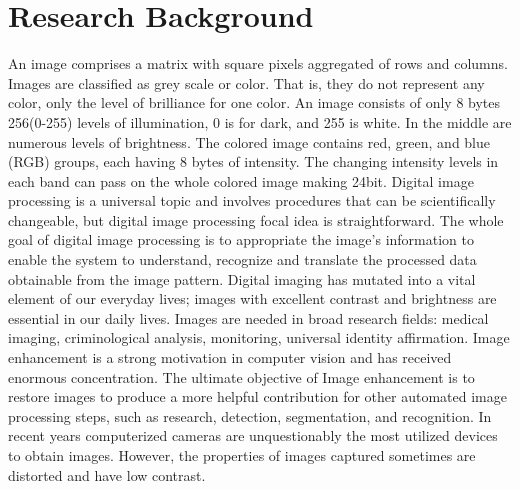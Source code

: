 \documentclass[doctor,english,listoffigures,listoftables]{thesis-uestc}
\begin{document}
\section{Research Background}
An image comprises a matrix with square pixels aggregated of rows and columns. Images are classified as grey scale or color. That is, they do not represent any color, only the level of brilliance for one color. An image consists of only 8 bytes 256(0-255) levels of illumination, 0 is for dark, and 255 is white. In the middle are numerous levels of brightness. The colored image contains red, green, and blue (RGB) groups, each having 8 bytes of intensity. The changing intensity levels in each band can pass on the whole colored image making 24bit. Digital image processing is a universal topic and involves procedures that can be scientifically changeable, but digital image processing focal idea is straightforward. The whole goal of digital image processing is to appropriate the image’s information to enable the system to understand, recognize and translate the processed data obtainable from the image pattern. Digital imaging has mutated into a vital element of our everyday lives; images with excellent contrast and brightness are essential in our daily lives. Images are needed in broad research fields: medical imaging, criminological analysis, monitoring, universal identity affirmation. Image enhancement is a strong motivation in computer vision and has received enormous concentration. The ultimate objective of Image enhancement is to restore images to produce a more helpful contribution for other automated image processing steps, such as research, detection, segmentation, and recognition. In recent years computerized cameras are unquestionably the most utilized devices to obtain images. However, the properties of images captured sometimes are distorted and have low contrast. 
\end{document}
